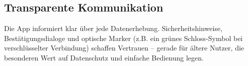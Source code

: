 \subsection{Transparente Kommunikation}
Die App informiert klar über jede Datenerhebung. 
Sicherheitshinweise, Bestätigungsdialoge und optische Marker 
(z.B. ein grünes Schloss-Symbol bei verschlüsselter Verbindung) 
schaffen Vertrauen -- gerade für ältere Nutzer, die besonderen Wert 
auf Datenschutz und einfache Bedienung legen.

\newpage

